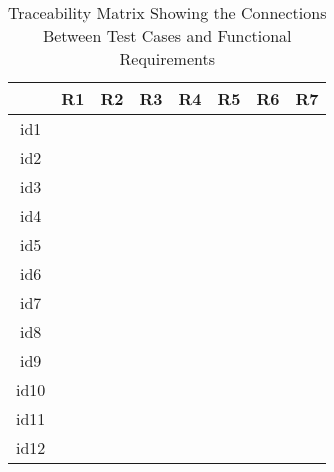 \documentclass[12pt, titlepage]{article}
\begin{document}
\begin{table}[!h]
	\begin{center}
		\begin{tabular}{| c | c | c | c | c | c | c | c |}
			\hline
			& R1 & R2 & R3 & R4 & R5 & R6 & R7\\
			\hline
			id1 & \checkmark &\checkmark & \checkmark& \checkmark& \checkmark& &\\
			\hline
			id2 & \checkmark &\checkmark & \checkmark& \checkmark& \checkmark& \checkmark&\\
			\hline
			id3 & \checkmark & & & & & & \\
			\hline
			id4 & \checkmark &\checkmark &\checkmark & & & & \\
			\hline
			id5 & \checkmark &\checkmark &\checkmark & & & & \\
			\hline
			id6 & \checkmark &\checkmark &\checkmark & & & & \\
			\hline
			id7 & \checkmark & & \checkmark& & & & \\
			\hline
			id8 & \checkmark &\checkmark & \checkmark& \checkmark & \checkmark& & \\
			\hline
			id9 & & \checkmark& & \checkmark& \checkmark& & \\
			\hline
			id10 & \checkmark & \checkmark& \checkmark& \checkmark& & & \\
			\hline
			id11 & \checkmark & \checkmark& \checkmark&\checkmark & \checkmark& \checkmark& \\
			\hline
			id12 & & \checkmark & & \checkmark& \checkmark& & \\
			\hline
		\end{tabular}
		\caption{Traceability Matrix Showing the Connections Between Test Cases and Functional Requirements}
	\end{center}
\end{table}   
\end{document}

